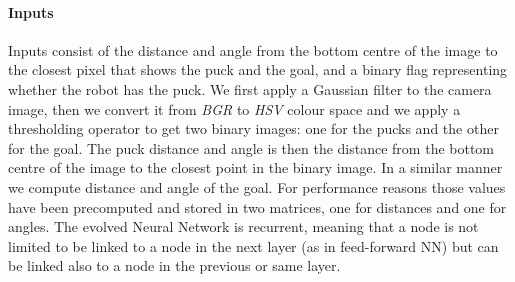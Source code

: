 \documentclass{article}
\begin{document}
	\paragraph{Inputs} %
	\label{par:foraging_inputs}
	Inputs consist of the distance and angle from the bottom centre of the image
	to the closest pixel that shows the puck and the goal, and a binary flag
	representing whether the robot has the puck. We first apply a Gaussian filter
	to the camera image, then we convert it from \textit{BGR} to \textit{HSV}
	colour space and we apply a thresholding operator to get two binary images:
	one for the pucks and the other for the goal. The puck distance and angle is
	then the distance from the bottom centre of the image to the closest point
	in the binary image. In a similar manner we compute distance and angle of
	the goal. For performance reasons those values have been precomputed and
	stored in two matrices, one for distances and one for angles.
	The evolved Neural Network is recurrent, meaning that a node is not limited
	to be linked to a node in the next layer (as in feed-forward NN) but can be
	linked also to a node in the previous or same layer.
\end{document}
